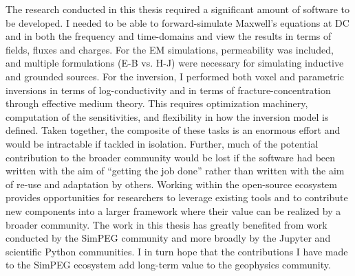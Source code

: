 The research conducted in this thesis required a significant amount of software to be developed. I needed to be able to forward-simulate Maxwell's equations at DC and in both the frequency and time-domains and view the results in terms of fields, fluxes and charges. For the EM simulations, permeability was included, and multiple formulations (E-B vs. H-J) were necessary for simulating inductive and grounded sources. For the inversion, I performed both voxel and parametric inversions in terms of log-conductivity and in terms of fracture-concentration through effective medium theory. This requires optimization machinery, computation of the sensitivities, and flexibility in how the inversion model is defined. Taken together, the composite of these tasks is an enormous effort and would be intractable if tackled in isolation. Further, much of the potential contribution to the broader community would be lost if the software had been written with the aim of ``getting the job done'' rather than written with the aim of re-use and adaptation by others. Working within the open-source ecosystem provides opportunities for researchers to leverage existing tools and to contribute new components into a larger framework where their value can be realized by a broader community. The work in this thesis has greatly benefited from work conducted by the SimPEG community and more broadly by the Jupyter and scientific Python communities. I in turn hope that the contributions I have made to the SimPEG ecosystem add long-term value to the geophysics community.

